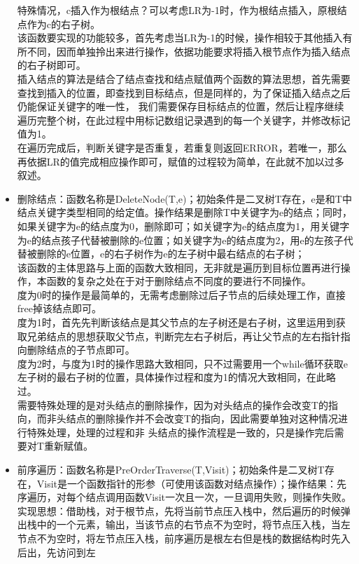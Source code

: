 \documentclass[supercite]{Experimental_Report}
\theoremstyle{definition}
\begin{document}
\begin{itemize}
	      特殊情况，c插入作为根结点？可以考虑LR为-1时，作为根结点插入，原根结点作为c的右子树。\\
	      该函数要实现的功能较多，首先考虑当LR为-1的时候，操作相较于其他插入有所不同，因而单独拎出来进行操作，依据功能要求将插入根节点作为插入结点的右子树即可。\\
	      插入结点的算法是结合了结点查找和结点赋值两个函数的算法思想，首先需要查找到插入的位置，即查找到目标结点，但是同样的，为了保证插入结点之后仍能保证关键字的唯一性，
	      我们需要保存目标结点的位置，然后让程序继续遍历完整个树，在此过程中用标记数组记录遇到的每一个关键字，并修改标记值为1。\\
	      在遍历完成后，判断关键字是否重复，若重复则返回ERROR，若唯一，那么再依据LR的值完成相应操作即可，赋值的过程较为简单，在此就不加以过多叙述。
	\item 删除结点：函数名称是DeleteNode(T,e)；初始条件是二叉树T存在，e是和T中结点关键字类型相同的给定值。操作结果是删除T中关键字为e的结点；同时，如果关键字为e的结点度为0，删除即可；如关键字为e的结点度为1，用关键字为e的结点孩子代替被删除的e位置；如关键字为e的结点度为2，用e的左孩子代替被删除的e位置，e的右子树作为e的左子树中最右结点的右子树；\\
	      该函数的主体思路与上面的函数大致相同，无非就是遍历到目标位置再进行操作，本函数的复杂之处在于对于删除结点不同度的要进行不同操作。\\
	      度为0时的操作是最简单的，无需考虑删除过后子节点的后续处理工作，直接free掉该结点即可。\\
	      度为1时，首先先判断该结点是其父节点的左子树还是右子树，这里运用到获取兄弟结点的思想获取父节点，判断完左右子树后，再让父节点的左右指针指向删除结点的子节点即可。\\
	      度为2时，与度为1时的操作思路大致相同，只不过需要用一个while循环获取e左子树的最右子树的位置，具体操作过程和度为1的情况大致相同，在此略过。\\
	      需要特殊处理的是对头结点的删除操作，因为对头结点的操作会改变T的指向，而非头结点的删除操作并不会改变T的指向，因此需要单独对这种情况进行特殊处理，处理的过程和非
	      头结点的操作流程是一致的，只是操作完后需要对T重新赋值。
	\item 前序遍历：函数名称是PreOrderTraverse(T,Visit)；初始条件是二叉树T存在，Visit是一个函数指针的形参（可使用该函数对结点操作）；操作结果：先序遍历，对每个结点调用函数Visit一次且一次，一旦调用失败，则操作失败。\\
	      实现思想：借助栈，对于根节点，先将当前节点压入栈中，然后遍历的时候弹出栈中的一个元素，输出，当该节点的右节点不为空时，将节点压入栈，当左节点不为空时，将左节点压入栈，前序遍历是根左右但是栈的数据结构时先入后出，先访问到左

\end{itemize}
\end{document}
